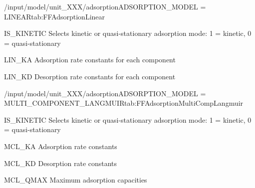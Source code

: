 \begin{condsubgroup}{/input/model/unit\_XXX/adsorption}{ADSORPTION\_MODEL = LINEAR}{tab:FFAdsorptionLinear}
  \begin{dataset}[type=int,range={$\{ 0,1 \}$},length=1]{IS\_KINETIC}
    Selects kinetic or quasi-stationary adsorption mode: 1 = kinetic, 0 = quasi-stationary
  \end{dataset}
  \begin{dataset}[unit=\si{\cubic\metre\of{MP}\per\cubic\metre\of{SP}\per\second},type=double,range={$\geq 0$},length={\texttt{NCOMP}}]{LIN\_KA}
    Adsorption rate constants for each component
  \end{dataset}
  \begin{dataset}[unit=\si{\per\second},type=double,range={$\geq 0$},length={\texttt{NCOMP}}]{LIN\_KD}
    Desorption rate constants for each component
  \end{dataset}
\end{condsubgroup}

\begin{condsubgroup}{/input/model/unit\_XXX/adsorption}{ADSORPTION\_MODEL = MULTI\_COMPONENT\_LANGMUIR}{tab:FFAdsorptionMultiCompLangmuir}
  \begin{dataset}[type=int,range={$\{ 0,1 \}$},length=1]{IS\_KINETIC}
    Selects kinetic or quasi-stationary adsorption mode: 1 = kinetic, 0 = quasi-stationary
  \end{dataset}
  \begin{dataset}[type=double,range={$\geq 0$},length={\texttt{NCOMP}}]{MCL\_KA}
    Adsorption rate constants
  \end{dataset}
  \begin{dataset}[unit=\si{\per\second}, type=double,range={$\geq 0$},length={\texttt{NCOMP}}]{MCL\_KD}
    Desorption rate constants
  \end{dataset}
  \begin{dataset}[unit=\si{\mol\per\cubic\metre\of{SP}}, type=double,range={$> 0$},length={\texttt{NCOMP}}]{MCL\_QMAX}
    Maximum adsorption capacities
  \end{dataset}
\end{condsubgroup}

